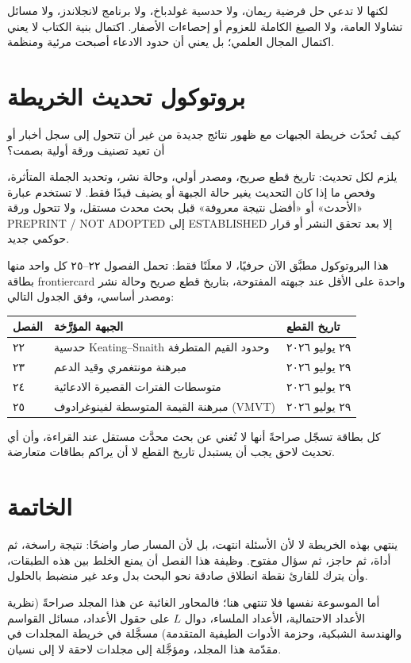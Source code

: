لكنها لا تدعي حل فرضية ريمان، ولا حدسية غولدباخ، ولا برنامج لانجلاندز، ولا مسائل تشاولا العامة، ولا الصيغ الكاملة للعزوم أو إحصاءات الأصفار. اكتمال بنية الكتاب لا يعني اكتمال المجال العلمي؛ بل يعني أن حدود الادعاء أصبحت مرئية ومنظمة.

\section{بروتوكول تحديث الخريطة}

\begin{openproblem}
\label{open:ch26-frontier-update}
\openresult
كيف تُحدّث خريطة الجبهات مع ظهور نتائج جديدة من غير أن تتحول إلى سجل أخبار أو أن تعيد تصنيف ورقة أولية بصمت؟

يلزم لكل تحديث: تاريخ قطع صريح، ومصدر أولي، وحالة نشر، وتحديد الجملة المتأثرة، وفحص ما إذا كان التحديث يغير حالة الجبهة أو يضيف قيدًا فقط. لا تستخدم عبارة «الأحدث» أو «أفضل نتيجة معروفة» قبل بحث محدث مستقل، ولا تتحول ورقة \textenglish{PREPRINT / NOT ADOPTED} إلى \textenglish{ESTABLISHED} إلا بعد تحقق النشر أو قرار حوكمي جديد.
\end{openproblem}

هذا البروتوكول مطبَّق الآن حرفيًا، لا معلَنًا فقط: تحمل الفصول ٢٢--٢٥ كل واحد منها بطاقة \textenglish{frontiercard} واحدة على الأقل عند جبهته المفتوحة، بتاريخ قطع صريح وحالة نشر ومصدر أساسي، وفق الجدول التالي:

\begin{center}
\small
\begin{tabular}{|l|l|l|}
\hline
\textbf{الفصل} & \textbf{الجبهة المؤرَّخة} & \textbf{تاريخ القطع}\\
\hline
٢٢ & حدسية Keating--Snaith وحدود القيم المتطرفة & ٢٩ يوليو ٢٠٢٦\\
٢٣ & مبرهنة مونتغمري وقيد الدعم & ٢٩ يوليو ٢٠٢٦\\
٢٤ & متوسطات الفترات القصيرة الادعائية & ٢٩ يوليو ٢٠٢٦\\
٢٥ & مبرهنة القيمة المتوسطة لفينوغرادوف (VMVT) & ٢٩ يوليو ٢٠٢٦\\
\hline
\end{tabular}
\end{center}

كل بطاقة تسجّل صراحةً أنها لا تُغني عن بحث محدَّث مستقل عند القراءة، وأن أي تحديث لاحق يجب أن يستبدل تاريخ القطع لا أن يراكم بطاقات متعارضة.

\section*{الخاتمة}

ينتهي \volumenumber{} بهذه الخريطة لا لأن الأسئلة انتهت، بل لأن المسار صار واضحًا: نتيجة راسخة، ثم أداة، ثم حاجز، ثم سؤال مفتوح. وظيفة هذا الفصل أن يمنع الخلط بين هذه الطبقات، وأن يترك للقارئ نقطة انطلاق صادقة نحو البحث بدل وعد غير منضبط بالحلول.

أما الموسوعة نفسها فلا تنتهي هنا؛ فالمحاور الغائبة عن هذا المجلد صراحةً (نظرية الأعداد الاحتمالية، الأعداد الملساء، دوال \(L\) على حقول الأعداد، مسائل القواسم والهندسة الشبكية، وحزمة الأدوات الطيفية المتقدمة) مسجَّلة في خريطة المجلدات في مقدّمة هذا المجلد، ومؤجَّلة إلى مجلدات لاحقة لا إلى نسيان.
